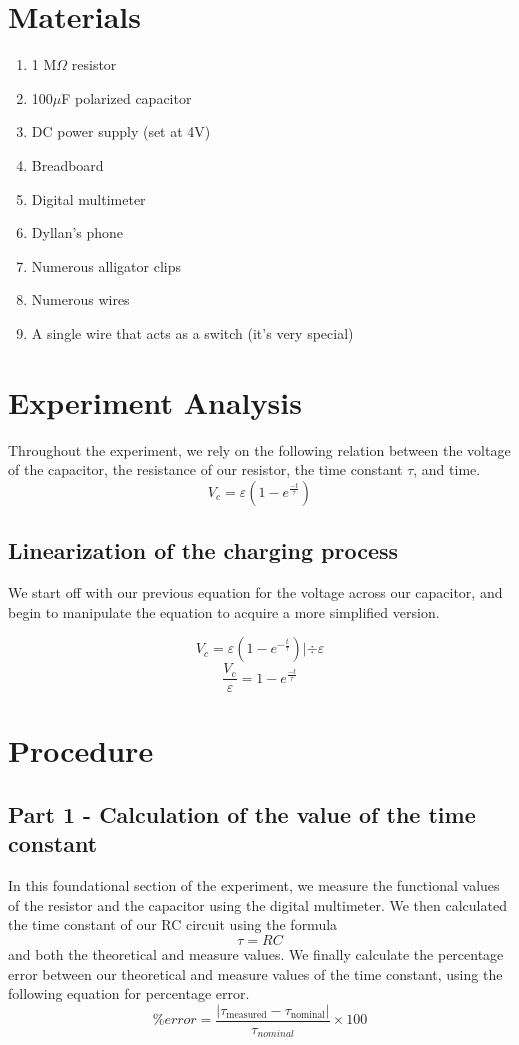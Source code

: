\documentclass[titlepage]{article}
\begin{document}
    \section{Materials} 
    \begin{enumerate} 
        \item 1 M$\Omega$ resistor
        \item 100$\mu$F polarized capacitor
        \item DC power supply (set at 4V)
        \item Breadboard
        \item Digital multimeter
        \item Dyllan's phone
        \item Numerous alligator clips
        \item Numerous wires 
        \item A single wire that acts as a switch (it's very special)
    \end{enumerate} 


	\section{Experiment Analysis}
    Throughout the experiment, we rely on the following relation between the voltage of the capacitor, the resistance of our resistor, the time constant $\tau$, and time. 
    $$ V_c = \varepsilon (1-e^\frac{-t}{\tau})$$



    \subsection{Linearization of the charging process}
    We start off with our previous equation for the voltage across our capacitor, and begin to manipulate the equation to acquire a more simplified version.


    $$V_c = \varepsilon \left( 1- e^{-\frac{t}{\tau}} \right)  | \div \varepsilon  $$
    $$ \frac{V_c}{\varepsilon}= 1-e^\frac{-t}{\tau}  $$

    



\section{Procedure}
    \subsection{Part 1 - Calculation of the value of the time constant} 
    In this foundational section of the experiment, we measure the functional values of the resistor and the capacitor using the digital multimeter. We then calculated the time constant of our RC circuit using the formula $$\tau = RC$$ and both the theoretical and measure values.
    We finally calculate the percentage error between our theoretical and measure values of the time constant, using the following equation for percentage error. $$\% error = \frac{|\tau_\text{measured} - \tau_\text{nominal}|}{\tau_{nominal}} \times 100$$
\end{document}
